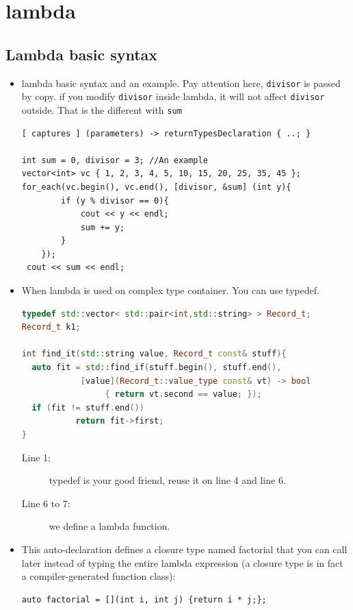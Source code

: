 \documentclass[a4paper,11pt,twoside]{book}
\begin{document}
\section{lambda}
\subsection{Lambda basic syntax}

\begin{itemize}
		\item lambda basic syntax and an example. Pay attention here, \texttt{divisor} is passed by copy. if you modify \texttt{divisor} inside lambda, it will not affect \texttt{divisor} outside. That is the different with \texttt{sum}

\begin{lstlisting}
[ captures ] (parameters) -> returnTypesDeclaration { ..; }

int sum = 0, divisor = 3; //An example
vector<int> vc { 1, 2, 3, 4, 5, 10, 15, 20, 25, 35, 45 };
for_each(vc.begin(), vc.end(), [divisor, &sum] (int y){
		if (y % divisor == 0){
			cout << y << endl;
			sum += y;
		}
	});
 cout << sum << endl;
\end{lstlisting}

		\item When lambda is used on complex type container. You can use typedef.
\begin{lstlisting}[frame=single, language=c++, mathescape=true]
typedef std::vector< std::pair<int,std::string> > Record_t;
Record_t k1;

int find_it(std::string value, Record_t const& stuff){
  auto fit = std::find_if(stuff.begin(), stuff.end(),
            [value](Record_t::value_type const& vt) -> bool
                 { return vt.second == value; });
  if (fit != stuff.end())
           return fit->first;
}
\end{lstlisting}

\begin{description}
	\item[Line 1:] typedef is your good friend, reuse it on line 4 and line 6.
	\item[Line 6 to 7:] we define a lambda function.
\end{description}

		\item This auto-declaration defines a closure type named factorial that you can call later instead of typing the entire lambda expression (a closure type is in fact a compiler-generated function class):
\begin{lstlisting}[numbers=none]
auto factorial = [](int i, int j) {return i * j;};


\end{lstlisting}
\end{itemize}
\end{document}
